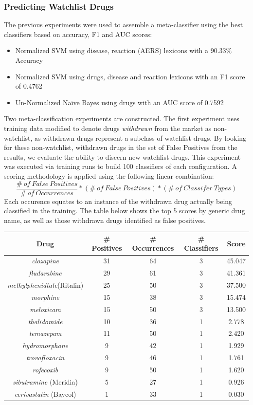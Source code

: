 \documentclass[twoside,11pt]{article}
\begin{document}
\subsubsection{Predicting Watchlist Drugs}
The previous experiments were used to assemble a meta-classifier using the best classifiers based on accuracy, F1 and AUC scores:
\begin{itemize}
  \item Normalized SVM using disease, reaction (AERS) lexicons with a 90.33\% Accuracy
  \item Normalized SVM using drugs, disease and reaction lexicons with an F1 score of 0.4762
  \item Un-Normalized Na\"ive Bayes using drugs with an AUC score of 0.7592
\end{itemize}
Two meta-classification experiments are constructed. The first experiment uses training data modified to denote drugs \textit{withdrawn} from the market as non-watchlist, as withdrawn drugs represent a subclass of watchlist drugs. By looking for these non-watchlist, withdrawn drugs in the set of False Positives from the results, we evaluate the ability to discern new watchlist drugs. This experiment was executed via training runs to build 100 classifiers of each configuration. A scoring methodology is applied using the following linear combination:
\[
  \frac{\#\ of\ False\ Positives}{\#\ of\ Occurrences} * (\#\ of\ False\ Positives) * (\#\ of\ Classifer\ Types)
\]
Each occurence equates to an instance of the withdrawn drug actually being classified in the training. The table below shows the top 5 scores by generic drug name, as well as those withdrawn drugs identified as false positives.
\begin{center}
  \begin{tabular}{||c c c c c||}
    \hline
    Drug & # Positives & # Occurrences & # Classifiers & Score \\
    \hline\hline
    \textit{clozapine} & 31 & 64 & 3 & 45.047 \\
    \hline
    \textit{fludarabine} & 29 & 61 & 3 & 41.361 \\
    \hline
    \textit{methylphenidtate}(Ritalin) & 25 & 50 & 3 & 37.500 \\
    \hline
    \textit{morphine} & 15 & 38 & 3 & 15.474 \\
    \hline
    \textit{meloxicam} & 15 & 50 & 3 & 13.500 \\
    \hline\hline
    \textit{thalidomide} & 10 & 36 & 1 & 2.778 \\
    \textit{temazepam} & 11 & 50 & 1 & 2.420 \\
    \textit{hydromorphone} & 9 & 42 & 1 & 1.929 \\
    \textit{trovafloxacin} & 9 & 46 & 1 & 1.761 \\
    \textit{rofecoxib} & 9 & 50 & 1 & 1.620 \\
    \textit{sibutramine} (Meridia) & 5 & 27 & 1 & 0.926 \\
    \textit{cerivastatin} (Baycol) & 1 & 33 & 1 & 0.030 \\
    \hline
  \end{tabular}
\end{center}
\end{document}
